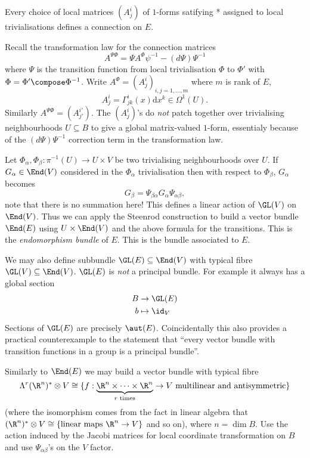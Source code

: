 \documentclass[a4paper]{article}
\begin{document}
\begin{theorem}
  Every choice of local matrices \((A_j^i)\) of \(1\)-forms satifying * assigned to local trivialisations defines a connection on \(E\).
\end{theorem}

Recall the transformation law for the connection matrices
\[
  A^{\Psi\Phi} = \Psi A^\Phi \psi^{-1} - (d\Psi) \Psi^{-1}
\]
where \(\Psi\) is the transition function from local trivialisation \(\Phi\) to \(\Phi'\) with \(\Phi = \Phi' \compose \Phi^{-1}\). Write \(A^\Phi = (A^i_j)_{i,j = 1, \dots, m}\) where \(m\) is rank of \(E\),
\[
  A^i_j = \Gamma^i_{jk}(x) \mathrm d x^k \in \Omega^1(U).
\]
Similarly \(A^{\Psi\Phi} = (A^{i'}_{j'})\). The \((A^i_j)\)'s do \emph{not} patch together over trivialising neighbourhoods \(U \subseteq B\) to give a global matrix-valued \(1\)-form, essentialy because of the \((d\Psi) \Psi^{-1}\) correction term in the transformation law.

Let \(\Phi_\alpha, \Phi_\beta: \pi^{-1}(U) \to U \times V\) be two trivialising neighbourhoods over \(U\). If \(G_\alpha \in \End(V)\) considered in the \(\Phi_\alpha\) trivialisation then with respect to \(\Phi_\beta\), \(G_\alpha\) becomes
\[
  G_\beta = \Psi_{\beta\alpha} G_\alpha \Psi_{\alpha\beta},
\]
note that there is no summation here! This defines a linear action of \(\GL(V)\) on \(\End(V)\). Thus we can apply the Steenrod construction to build a vector bundle \(\End(E)\) using \(U \times \End(V)\) and the above formula for the transitions. This is the \emph{endomorphism bundle} of \(E\). This is the bundle associated to \(E\).

\begin{remark}
  We may also define subbundle \(\GL(E) \subseteq \End(V)\) with typical fibre \(\GL(V) \subseteq \End(V)\). \(\GL(E)\) is \emph{not} a principal bundle. For example it always has a global section
  \begin{align*}
    B &\to \GL(E) \\
    b &\mapsto \id_V
  \end{align*}
  Sections of \(\GL(E)\) are precisely \(\aut(E)\). Coincidentally this also provides a practical counterexample to the statement that ``every vector bundle with transition functions in a group is a principal bundle''.
\end{remark}

Similarly to \(\End(E)\) we may build a vector bundle with typical fibre
\[
  \Lambda^r(\R^n)^* \otimes V \cong \{f: \underbrace{\R^n \times \dots \times \R^n}_{r \text{ times}} \to V \text{ multilinear and antisymmetric}\}
\]
(where the isomorphism comes from the fact in linear algebra that \((\R^n)^* \otimes V \cong \{\text{linear maps } \R^n \to V\}\) and so on), where \(n = \dim B\). Use the action induced by the Jacobi matrices for local coordinate transformation on \(B\) and use \(\Psi_{\alpha\beta}\)'s on the \(V\) factor.
\end{document}
